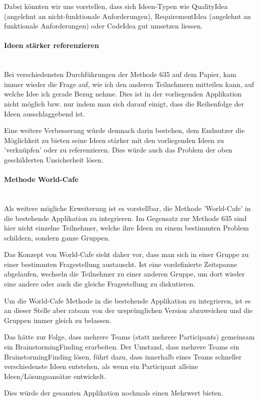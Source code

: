Dabei könnten wir uns vorstellen, dass sich Ideen-Typen wie QualityIdea (angelehnt an nicht-funktionale Anforderungen), RequirementIdea (angelehnt an funktionale Anforderungen)  oder CodeIdea gut umsetzen liessen.

\paragraph*{Ideen stärker referenzieren}~\\
Bei verschiedensten Durchführungen der Methode 635 auf dem Papier, kam immer wieder die Frage auf, wie ich den anderen Teilnehmern mitteilen kann, auf welche Idee ich gerade Bezug nehme. Dies ist in der vorliegenden Applikation nicht möglich bzw. nur indem man sich darauf einigt, dass die Reihenfolge der Ideen ausschlaggebend ist.

Eine weitere Verbesserung würde demnach darin bestehen, dem Endnutzer die Möglichkeit zu bieten seine Ideen stärker mit den vorliegenden Ideen zu 'verknüpfen' oder zu referenzieren. Dies würde auch das Problem der oben geschilderten Unsicherheit lösen.

\paragraph*{Methode World-Cafe}~\\
Als weitere mögliche Erweiterung ist es vorstellbar, die Methode 'World-Cafe' \cite{world-cafe} in die bestehende Applikation zu integrieren. Im Gegensatz zur Methode 635 sind hier nicht einzelne Teilnehmer, welche ihre Ideen zu einem bestimmten Problem schildern, sondern ganze Gruppen.

Das Konzept von World-Cafe sieht daher vor, dass man sich in einer Gruppe zu einer bestimmten Fragestellung austauscht. Ist eine vordefinierte Zeitspanne abgelaufen, wechseln die Teilnehmer zu einer anderen Gruppe, um dort wieder eine andere oder auch die gleiche Fragestellung zu diskutieren. 

Um die World-Cafe Methode in die bestehende Applikation zu integrieren, ist es an dieser Stelle aber ratsam von der ursprünglichen Version abzuweichen und die Gruppen immer gleich zu belassen. 

Das hätte zur Folge, dass mehrere Teams (statt mehrere Participants) gemeinsam ein BrainstormingFinding erarbeiten. Der Umstand, dass mehrere Teams ein BrainstormingFinding lösen, führt dazu, dass innerhalb eines Teams schneller verschiedenste Ideen entstehen, als wenn ein Participant alleine Ideen/Lösungsansätze entwickelt. 

Dies würde der gesamten Applikation nochmals einen Mehrwert bieten. 

